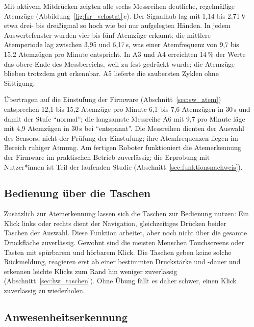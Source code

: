 Mit aktivem Mitdrücken zeigten alle sechs Messreihen deutliche, regelmäßige Atemzüge
(Abbildung~\ref{fig:fsr_velostat}\,c). Der Signalhub lag mit 1{,}14 bis 2{,}71\,V etwa
drei- bis dreißigmal so hoch wie bei nur aufgelegten Händen. In jedem Auswertefenster wurden vier
bis fünf Atemzüge erkannt; die mittlere Atemperiode lag zwischen 3{,}95 und 6{,}17\,s, was einer
Atemfrequenz von 9{,}7 bis 15{,}2 Atemzügen pro Minute entspricht. In A3 und A4 erreichten 14\,\%
der Werte das obere Ende des Messbereichs, weil zu fest gedrückt wurde; die Atemzüge blieben
trotzdem gut erkennbar. A5 lieferte die saubersten Zyklen ohne Sättigung.

Übertragen auf die Einstufung der Firmware (Abschnitt~\ref{sec:sw_atem}) entsprechen 12{,}1 bis
15{,}2 Atemzüge pro Minute 6{,}1 bis 7{,}6 Atemzügen in 30\,s und damit der Stufe
\enquote{normal}; die langsamste Messreihe A6 mit 9{,}7 pro Minute läge mit 4{,}9 Atemzügen in
30\,s bei \enquote{entspannt}. Die Messreihen dienten der Auswahl des Sensors, nicht der
Prüfung der Einstufung; ihre Atemfrequenzen liegen im Bereich ruhiger Atmung. Am fertigen Roboter
funktioniert die Atemerkennung der Firmware im praktischen Betrieb zuverlässig; die Erprobung mit
Nutzer*innen ist Teil der laufenden Studie (Abschnitt~\ref{sec:funktionsnachweis}).

\subsection{Bedienung über die Taschen}
\label{sec:erg_bedienung}

Zusätzlich zur Atemerkennung lassen sich die Taschen zur Bedienung nutzen: Ein Klick links oder
rechts dient der Navigation, gleichzeitiges Drücken beider Taschen der Auswahl. Diese Funktion
arbeitet, aber noch nicht über die gesamte Druckfläche zuverlässig. Gewohnt sind die meisten Menschen
Touchscreens oder Tasten mit spürbarem und hörbarem Klick. Die Taschen geben keine solche
Rückmeldung, reagieren erst ab einer bestimmten Druckstärke und -dauer und erkennen leichte
Klicks zum Rand hin weniger zuverlässig (Abschnitt~\ref{sec:hw_taschen}). Ohne Übung fällt es
daher schwer, einen Klick zuverlässig zu wiederholen.

\subsection{Anwesenheitserkennung}
\label{sec:erg_anwesenheit}

